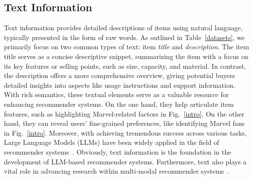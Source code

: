 \documentclass[lettersize,journal]{IEEEtran}
\newcommand{\fig}{Fig.\xspace}
\begin{document}
\subsection{Text Information}
{Text} information provides detailed descriptions of items using natural language, typically presented in the form of raw words. As outlined in Table~\ref{datasets}, we primarily focus on two common types of text: item \emph{title} and \emph{description}. The item title serves as a concise descriptive snippet, summarizing the item with a focus on its key features or selling points, such as size, capacity, and material. In contrast, the description offers a more comprehensive overview, giving potential buyers detailed insights into aspects like usage instructions and support information. With rich semantics, these textual elements serve as a valuable resource for enhancing recommender systems. On the one hand, they help articulate item features, such as highlighting Marvel-related factors in \fig~\ref{intro}. On the other hand, they can reveal users' fine-grained preferences, like identifying Marvel fans in \fig~\ref{intro}. Moreover, with achieving tremendous success across various tasks, Large Language Models (LLMs) have been widely applied in the field of recommender systems~\cite{Wang@AAAI2024,Lin@SIGIR2024,Zhao@SIGIR2024}. Obviously, text information is the foundation in the development of LLM-based recommender systems. Furthermore, text also plays a vital role in advancing research within multi-modal recommender systems~\cite{Hu@CIKM2023,Zhou@WWW2023,wei@MM2020}.

\end{document}
